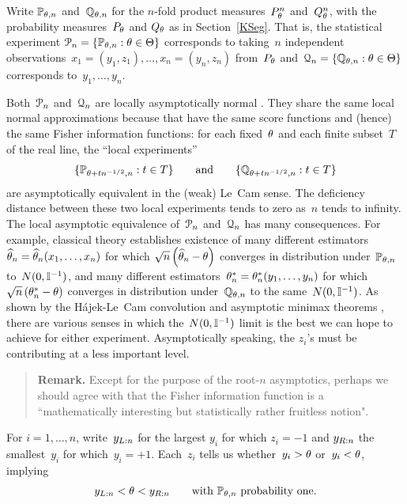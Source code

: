 \documentclass[aos]{imsart}
\theoremstyle{plain}
\theoremstyle{remark}
\newenvironment{remark}{\begin{quote}{\bf Remark.\quad}\rm\small}{\end{quote}}
\def\Remark{\begin{remark}}
\def\endRemark{\end{remark}}
\begin{document}
Write ${\mathbb P}_{\theta,n}$ and~${\mathbb Q}_{\theta,n}$ for the $n$-fold product measures~$P_\theta^n$
and~$Q_\theta^n$, with the probability measures~$P_\theta$ and $Q_\theta$ as in Section~\ref{KSeg}.  That is, the statistical experiment
${\EuScript P}_n=\{{\mathbb P}_{\theta,n}: \theta\in \Theta\}$ corresponds to taking~$n$ independent observations~$x_1=(y_1,z_1),\dots, x_n=(y_n,z_n)$ from~$P_\theta$ and~${\EuScript Q}_n=\{{\mathbb Q}_{\theta,n}:\theta\in\Theta\}$ corresponds to~$y_1,\dots,y_n$. 

Both~${\EuScript P}_n$ and~${\EuScript Q}_n$ are locally asymptotically normal
\cite[Chapter~6]{LeCam:Yang:2000book}. They share the same local normal approximations because that have the same score functions and (hence) the same Fisher information functions: for each fixed~$\theta$ and each finite subset~$T$ of the real line, the ``local experiments''
\begin{equation*}
\{{\mathbb P}_{\theta+tn^{-1/2},n}:t\in T\}\qquad\hbox{\rm and}\qquad
\{{\mathbb Q}_{\theta+tn^{-1/2},n}:t\in T\}
\end{equation*} 
are asymptotically equivalent in the  (weak) Le~Cam sense. The deficiency distance
\cite[Section~2.2]{LeCam:Yang:2000book} between these two local experiments tends to zero as~$n$ tends to infinity. 
The local asymptotic equivalence of~${\EuScript P}_n$ and~${\EuScript Q}_n$ has many  consequences. For example, classical theory establishes existence of many different estimators~$\widehat \theta_n=\widehat \theta_n(x_1,\dots,x_n)$ for which $\sqrt{n}\left(\widehat \theta_n-\theta\right)$ converges in distribution under~${\mathbb P}_{\theta,n}$ to~$N(0,{\mathbb I}^{-1})$, and  
many different estimators~$\theta_n^*= \theta_n^*(y_1,\dots,y_n)$ for which $\sqrt{n}\left(\theta_n^*-\theta\right)$ converges in distribution under~${\mathbb Q}_{\theta,n}$ to the same~$N(0,{\mathbb I}^{-1})$.
As shown by the H\'ajek-Le~Cam convolution and asymptotic minimax theorems \cite[Section~2.3]{BKRW:93book}, there are various senses in which 
the~$N(0,{\mathbb I}^{-1})$ limit is the best we can hope to achieve for 
either experiment.
Asymptotically speaking, the $z_i$'s must be contributing at a less important level. 

\Remark
Except for the purpose of the root-$n$ asymptotics,  perhaps we should agree with \citet[Section~5]{Basu1975StatInfo} that  the Fisher information function is a ``mathematically interesting but statistically rather fruitless notion".
\endRemark

For $i=1,\dots,n$, write~$y_{L:n}$ for the largest $y_i$   for which $z_i = -1$  and $y_{R:n}$ the smallest~$y_i$ for which~$y_i=+1$. Each~$z_i$ tells us whether~$y_i>\theta$ or~$y_i<\theta$, implying
\begin{equation}
y_{L:n}<\theta <y_{R:n}\qquad\hbox{\rm with ${\mathbb P}_{\theta,n}$ probability one}.
\label{z.int}
\end{equation}
\end{document}
